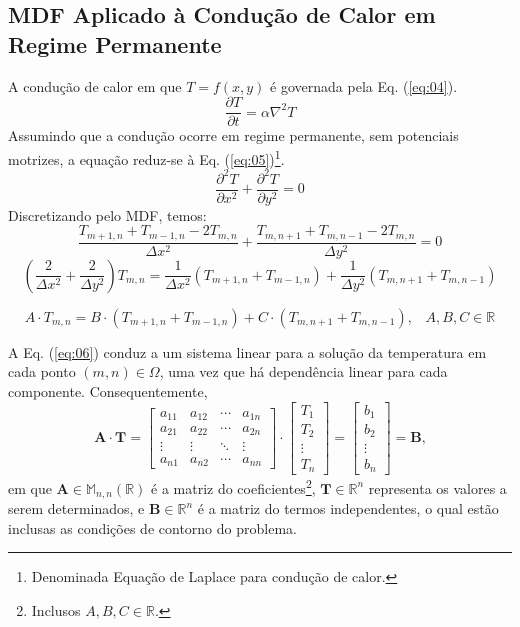 \documentclass[11pt]{article}
\begin{document}
	\subsection{MDF Aplicado à Condução de Calor em Regime Permanente}
	
	A condução de calor em que $T=f(x,y)$ é governada pela Eq. (\ref{eq:04}).
	\begin{equation}
		\frac{\partial T}{\partial t}=\alpha \nabla^2 T
		\label{eq:04}
	\end{equation}
	Assumindo que a condução ocorre em regime permanente, sem potenciais motrizes, a equação reduz-se à Eq. (\ref{eq:05})\footnote{Denominada Equação de Laplace para condução de calor.}.
	\begin{equation}
		\frac{\partial^2 T}{\partial x^2} + \frac{\partial^2 T}{\partial y^2} = 0
		\label{eq:05}
	\end{equation}
	Discretizando pelo MDF, temos:
	$$\frac{T_{m+1,n}+T_{m-1,n}-2T_{m,n}}{\Delta x^2}+\frac{T_{m,n+1}+T_{m,n-1}-2T_{m,n}}{\Delta y^2}=0$$
	$$\left(\frac{2}{\Delta x^2}+\frac{2}{\Delta y^2}\right)T_{m,n}=\frac{1}{\Delta x^2}\left(T_{m+1,n}+T_{m-1,n}\right)+\frac{1}{\Delta y^2}\left(T_{m,n+1}+T_{m,n-1}\right)$$
	
	\begin{equation}
		A\cdot T_{m,n}=B\cdot \left(T_{m+1,n}+T_{m-1,n}\right)+C\cdot \left(T_{m,n+1}+T_{m,n-1}\right)\text{,}\quad A,B,C \in \mathbb{R}
		\label{eq:06}
	\end{equation}

	A Eq. (\ref{eq:06}) conduz a um sistema linear para a solução da temperatura em cada ponto $(m,n) \in \Omega$, uma vez que há dependência linear para cada componente. Consequentemente,
	\[
	\mathbf{A}\cdot \mathbf{T} = 
	\begin{bmatrix}
		a_{11} & a_{12} & \cdots & a_{1n} \\
		a_{21} & a_{22} & \cdots & a_{2n} \\
		\vdots & \vdots & \ddots & \vdots \\
		a_{n1} & a_{n2} & \cdots & a_{nn}
	\end{bmatrix}
	\cdot
	\begin{bmatrix}
		T_1 \\
		T_2 \\
		\vdots \\
		T_n
	\end{bmatrix}
	=
	\begin{bmatrix}
		b_1 \\
		b_2 \\
		\vdots \\
		b_n
	\end{bmatrix}
	=
	\mathbf{B}\text{,}
	\]
	em que $\mathbf{A} \in \mathbb{M}_{n,n}(\mathbb{R})$ é a matriz do coeficientes\footnote{Inclusos $A,B,C \in \mathbb{R}$.}, $\mathbf{T} \in \mathbb{R}^n$ representa os valores a serem determinados, e $\mathbf{B} \in \mathbb{R}^n$ é a matriz do termos independentes, o qual estão inclusas as condições de contorno do problema.
\end{document}
